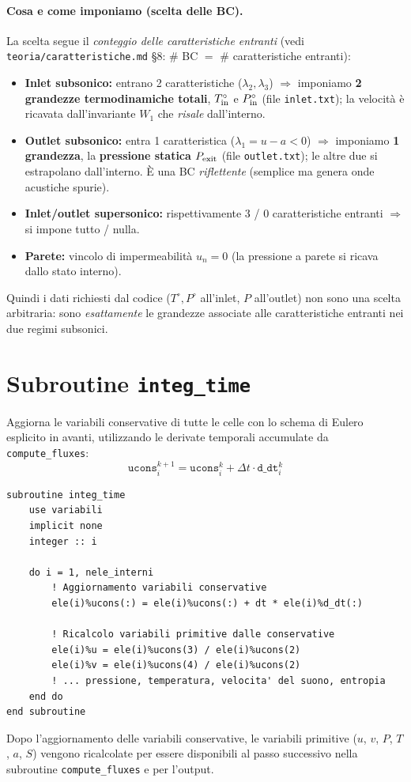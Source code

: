 \paragraph{Cosa e come imponiamo (scelta delle BC).}
La scelta segue il \emph{conteggio delle caratteristiche entranti} (vedi
\texttt{teoria/caratteristiche.md} \S8: \# BC $=$ \# caratteristiche entranti):
\begin{itemize}
  \item \textbf{Inlet subsonico:} entrano 2 caratteristiche ($\lambda_2,\lambda_3$)
        $\Rightarrow$ imponiamo \textbf{2 grandezze termodinamiche totali},
        $T^\circ_{\rm in}$ e $P^\circ_{\rm in}$ (file \texttt{inlet.txt}); la
        velocità è ricavata dall'invariante $W_1$ che \emph{risale} dall'interno.
  \item \textbf{Outlet subsonico:} entra 1 caratteristica ($\lambda_1=u-a<0$)
        $\Rightarrow$ imponiamo \textbf{1 grandezza}, la \textbf{pressione statica}
        $P_{\rm exit}$ (file \texttt{outlet.txt}); le altre due si estrapolano
        dall'interno. È una BC \emph{riflettente} (semplice ma genera onde
        acustiche spurie).
  \item \textbf{Inlet/outlet supersonico:} rispettivamente 3 / 0 caratteristiche
        entranti $\Rightarrow$ si impone tutto / nulla.
  \item \textbf{Parete:} vincolo di impermeabilità $u_n=0$ (la pressione a parete
        si ricava dallo stato interno).
\end{itemize}
Quindi i dati richiesti dal codice ($T^\circ,P^\circ$ all'inlet, $P$ all'outlet)
non sono una scelta arbitraria: sono \emph{esattamente} le grandezze associate
alle caratteristiche entranti nei due regimi subsonici.

\section{Subroutine \texttt{integ\_time}}

Aggiorna le variabili conservative di tutte le celle con lo schema di
Eulero esplicito in avanti, utilizzando le derivate temporali accumulate
da \texttt{compute\_fluxes}:
\[
  \mathtt{ucons}_i^{k+1} = \mathtt{ucons}_i^k + \Delta t \cdot \mathtt{d\_dt}_i^k
\]

\begin{lstlisting}[style=fortran]
subroutine integ_time
    use variabili
    implicit none
    integer :: i

    do i = 1, nele_interni
        ! Aggiornamento variabili conservative
        ele(i)%ucons(:) = ele(i)%ucons(:) + dt * ele(i)%d_dt(:)

        ! Ricalcolo variabili primitive dalle conservative
        ele(i)%u = ele(i)%ucons(3) / ele(i)%ucons(2)
        ele(i)%v = ele(i)%ucons(4) / ele(i)%ucons(2)
        ! ... pressione, temperatura, velocita' del suono, entropia
    end do
end subroutine
\end{lstlisting}

Dopo l'aggiornamento delle variabili conservative, le variabili primitive
($u$, $v$, $P$, $T$, $a$, $S$) vengono ricalcolate per essere disponibili
al passo successivo nella subroutine \texttt{compute\_fluxes} e per
l'output.
